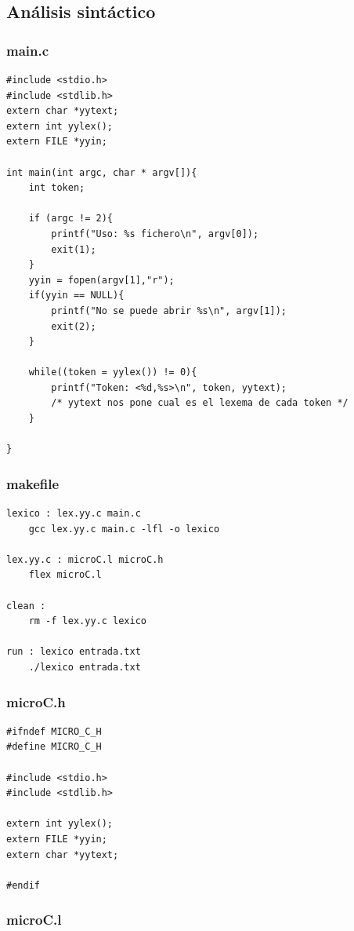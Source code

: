 \documentclass[a4paper,12pt]{article}
\begin{document}
\subsection{Análisis sintáctico}
\subsubsection{main.c}
\begin{lstlisting}[caption={main.c}]
    #include <stdio.h>
#include <stdlib.h>
extern char *yytext;
extern int yylex();
extern FILE *yyin;

int main(int argc, char * argv[]){
    int token;

    if (argc != 2){
        printf("Uso: %s fichero\n", argv[0]);
        exit(1);
    }
    yyin = fopen(argv[1],"r");
    if(yyin == NULL){
        printf("No se puede abrir %s\n", argv[1]);
        exit(2);
    }

    while((token = yylex()) != 0){
        printf("Token: <%d,%s>\n", token, yytext);
        /* yytext nos pone cual es el lexema de cada token */
    }

}
\end{lstlisting}
\subsubsection{makefile}
\begin{lstlisting}[caption={makefile}]
lexico : lex.yy.c main.c
	gcc lex.yy.c main.c -lfl -o lexico

lex.yy.c : microC.l microC.h
	flex microC.l

clean : 
	rm -f lex.yy.c lexico

run : lexico entrada.txt
	./lexico entrada.txt

\end{lstlisting}
\subsubsection{microC.h}
\begin{lstlisting}[caption={microC.h}]
#ifndef MICRO_C_H
#define MICRO_C_H

#include <stdio.h>
#include <stdlib.h>

extern int yylex();
extern FILE *yyin;
extern char *yytext;

#endif
\end{lstlisting}
\subsubsection{microC.l}
\end{document}
